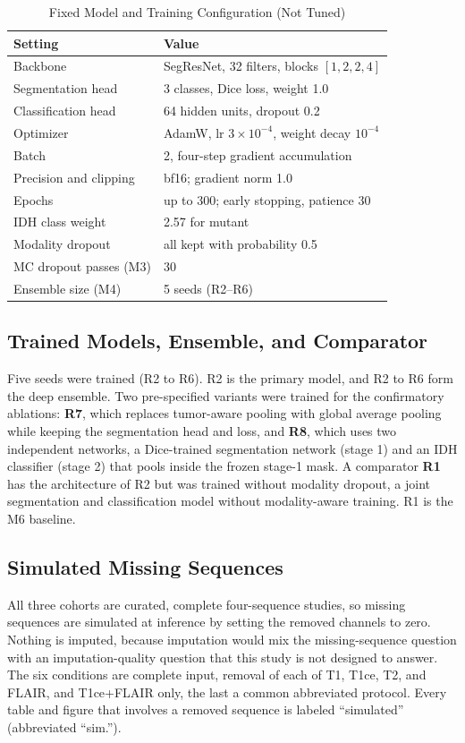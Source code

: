 \documentclass[journal]{IEEEtran}
\begin{document}
\begin{table}[t]
\centering
\caption{Fixed Model and Training Configuration (Not Tuned)}
\label{tab:hyper}
\footnotesize
\begin{tabular}{lp{}}
\toprule
Setting & Value \\
\midrule
Backbone & SegResNet, 32 filters, blocks $[1,2,2,4]$ \\
Segmentation head & 3 classes, Dice loss, weight 1.0 \\
Classification head & 64 hidden units, dropout 0.2 \\
Optimizer & AdamW, lr $3\times10^{-4}$, weight decay $10^{-4}$ \\
Batch & 2, four-step gradient accumulation \\
Precision and clipping & bf16; gradient norm 1.0 \\
Epochs & up to 300; early stopping, patience 30 \\
IDH class weight & 2.57 for mutant \\
Modality dropout & all kept with probability 0.5 \\
MC dropout passes (M3) & 30 \\
Ensemble size (M4) & 5 seeds (R2--R6) \\
\bottomrule
\end{tabular}
\end{table}

\subsection{Trained Models, Ensemble, and Comparator}
Five seeds were trained (R2 to R6). R2 is the primary model, and R2 to R6 form the deep ensemble. Two pre-specified variants were trained for the confirmatory ablations: \textbf{R7}, which replaces tumor-aware pooling with global average pooling while keeping the segmentation head and loss, and \textbf{R8}, which uses two independent networks, a Dice-trained segmentation network (stage 1) and an IDH classifier (stage 2) that pools inside the frozen stage-1 mask. A comparator \textbf{R1} has the architecture of R2 but was trained without modality dropout, a joint segmentation and classification model without modality-aware training. R1 is the M6 baseline.

\subsection{Simulated Missing Sequences}
All three cohorts are curated, complete four-sequence studies, so missing sequences are simulated at inference by setting the removed channels to zero. Nothing is imputed, because imputation would mix the missing-sequence question with an imputation-quality question that this study is not designed to answer. The six conditions are complete input, removal of each of T1, T1ce, T2, and FLAIR, and T1ce+FLAIR only, the last a common abbreviated protocol. Every table and figure that involves a removed sequence is labeled ``simulated'' (abbreviated ``sim.'').
\end{document}
